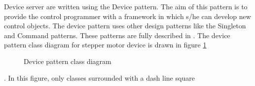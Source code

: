Device server are written using the Device pattern.
The aim of this pattern is to provide the control programmer with
a framework in which s/he can develop new control objects. The device
pattern uses other design patterns like the Singleton
and Command patterns. These patterns are fully described in \cite{Patterns}.
The device pattern class diagram for stepper motor device is drawn
in figure \ref{Dvice pattern figure}
\begin{figure}
\begin{centering}
\par\end{centering}

\protect\caption{Device pattern class diagram\label{Dvice pattern figure}}
\end{figure}
. In this figure, only classes surrounded with a dash line square
